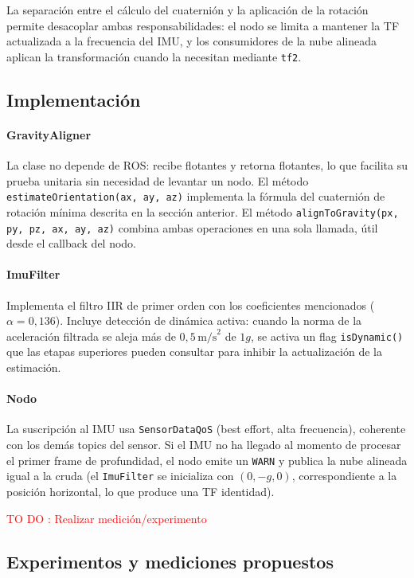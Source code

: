 La separación entre el cálculo del cuaternión y la aplicación de la rotación
permite desacoplar ambas responsabilidades: el nodo se limita a mantener la
TF actualizada a la frecuencia del IMU, y los consumidores de la nube
alineada aplican la transformación cuando la necesitan mediante \texttt{tf2}.

\subsection{Implementación}

\paragraph{GravityAligner} La clase no depende de ROS: recibe flotantes y
retorna flotantes, lo que facilita su prueba unitaria sin necesidad de levantar
un nodo. El método \texttt{estimateOrientation(ax, ay, az)} implementa la
fórmula del cuaternión de rotación mínima descrita en la sección anterior.
El método \texttt{alignToGravity(px, py, pz, ax, ay, az)} combina ambas
operaciones en una sola llamada, útil desde el callback del nodo.

\paragraph{ImuFilter} Implementa el filtro IIR de primer orden con los
coeficientes mencionados ($\alpha = 0{,}136$). Incluye detección de dinámica
activa: cuando la norma de la aceleración filtrada se aleja más de
$0{,}5\,\text{m/s}^2$ de $1g$, se activa un flag \texttt{isDynamic()} que
las etapas superiores pueden consultar para inhibir la actualización de la
estimación.

\paragraph{Nodo} La suscripción al IMU usa \texttt{SensorDataQoS} (best
effort, alta frecuencia), coherente con los demás topics del sensor. Si el
IMU no ha llegado al momento de procesar el primer frame de profundidad, el
nodo emite un \texttt{WARN} y publica la nube alineada igual a la cruda (el
\texttt{ImuFilter} se inicializa con $(0, -g, 0)$, correspondiente a la
posición horizontal, lo que produce una TF identidad).

{\large\textcolor{red}{TO DO : Realizar medición/experimento}}

\subsection{Experimentos y mediciones propuestos}

